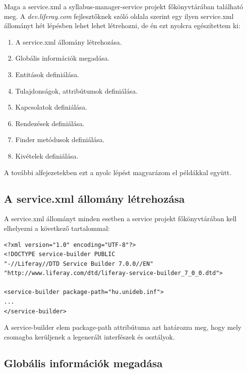 \documentclass[hidelinks, 12pt, a4paper]{report}
\begin{document}
Maga a service.xml a syllabus-manager-service projekt főkönyvtárában található meg. A \emph{dev.liferay.com} fejlesztőknek szóló oldala szerint egy ilyen service.xml állományt hét lépésben lehet lehet létrehozni, de én ezt nyolcra egészítettem ki:
\begin{enumerate}
\item A service.xml állomány létrehozása.
\item Globális információk megadása.
\item Entitások definiálása.
\item Tulajdonságok, attribútumok definiálása.
\item Kapcsolatok definiálása.
\item Rendezések definiálása.
\item Finder metódusok definiálása.
\item Kivételek definiálása.
\end{enumerate}


A további alfejezetekben ezt a nyolc lépést magyarázom el példákkal együtt.

\subsection{A service.xml állomány létrehozása}

A service.xml állományt minden esetben a service projekt főkönyvtárában kell elhelyezni a következő tartalommal:

\begin{minipage}{\linewidth}
\begin{lstlisting}[basicstyle=\small]
<?xml version="1.0" encoding="UTF-8"?>
<!DOCTYPE service-builder PUBLIC
"-//Liferay//DTD Service Builder 7.0.0//EN"
"http://www.liferay.com/dtd/liferay-service-builder_7_0_0.dtd">

<service-builder package-path="hu.unideb.inf">
...
</service-builder>
\end{lstlisting}
\end{minipage}

A service-builder elem package-path attribútuma azt határozza meg, hogy mely csomagba kerüljenek a legenerált interfészek és osztályok.

\subsection{Globális információk megadása}
\end{document}
